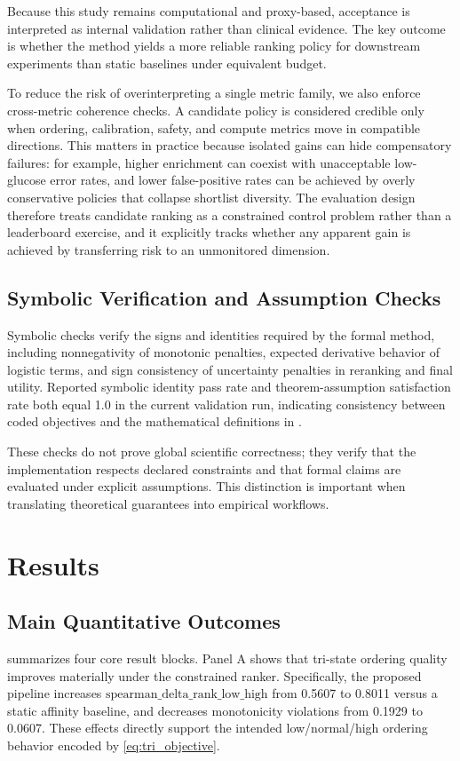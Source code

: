 \documentclass{article} %
\begin{document}
Because this study remains computational and proxy-based, acceptance is interpreted as internal validation rather than clinical evidence. The key outcome is whether the method yields a more reliable ranking policy for downstream experiments than static baselines under equivalent budget.

To reduce the risk of overinterpreting a single metric family, we also enforce cross-metric coherence checks. A candidate policy is considered credible only when ordering, calibration, safety, and compute metrics move in compatible directions. This matters in practice because isolated gains can hide compensatory failures: for example, higher enrichment can coexist with unacceptable low-glucose error rates, and lower false-positive rates can be achieved by overly conservative policies that collapse shortlist diversity. The evaluation design therefore treats candidate ranking as a constrained control problem rather than a leaderboard exercise, and it explicitly tracks whether any apparent gain is achieved by transferring risk to an unmonitored dimension.

\subsection{Symbolic Verification and Assumption Checks}
Symbolic checks verify the signs and identities required by the formal method, including nonnegativity of monotonic penalties, expected derivative behavior of logistic terms, and sign consistency of uncertainty penalties in reranking and final utility. Reported symbolic identity pass rate and theorem-assumption satisfaction rate both equal 1.0 in the current validation run, indicating consistency between coded objectives and the mathematical definitions in .

These checks do not prove global scientific correctness; they verify that the implementation respects declared constraints and that formal claims are evaluated under explicit assumptions. This distinction is important when translating theoretical guarantees into empirical workflows.

\section{Results}
\label{sec:results}
\subsection{Main Quantitative Outcomes}
 summarizes four core result blocks. Panel A shows that tri-state ordering quality improves materially under the constrained ranker. Specifically, the proposed pipeline increases $\text{spearman\_delta\_rank\_low\_high}$ from 0.5607 to 0.8011 versus a static affinity baseline, and decreases monotonicity violations from 0.1929 to 0.0607. These effects directly support the intended low/normal/high ordering behavior encoded by \eqref{eq:tri_objective}.
\end{document}
